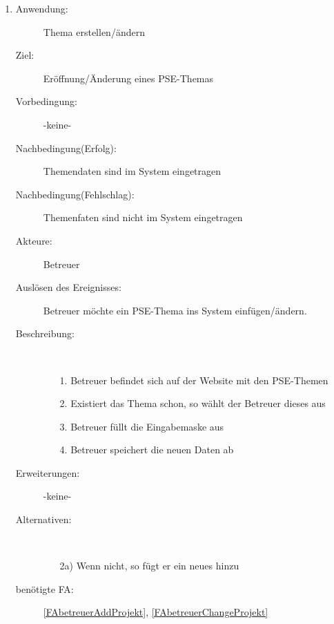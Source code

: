\documentclass[parskip=full]{scrartcl}
\newcommand{\swtLabel}[1]{\textbf{/#1\arabic*0/}}
\begin{document}
\begin{enumerate} [label=\swtLabel{B}]
  
  \item \label{UCbetreuerThemaErstellenÄndern}
	\begin{description}
  		\item[Anwendung:] Thema erstellen/ändern
  		\item[Ziel:] Eröffnung/Änderung eines \gls{PSE}-Themas
  		\item[Vorbedingung:] -keine-
  		\item[Nachbedingung(Erfolg):] Themendaten sind im System eingetragen
  		\item[Nachbedingung(Fehlschlag):] Themenfaten sind nicht im System
  		eingetragen
  		\item[Akteure:] Betreuer
  		\item[Auslösen des Ereignisses:] Betreuer möchte ein \gls{PSE}-Thema ins System
  		einfügen/ändern.
  		\item[Beschreibung:]~
  	\begin{enumerate}
  	  \item[1.] Betreuer befindet sich auf der Website mit den \gls{PSE}-Themen
  	  \item[2.] Existiert das Thema schon, so wählt der Betreuer dieses aus
  	  \item[3.] Betreuer füllt die Eingabemaske aus
  	  \item[4.] Betreuer speichert die neuen Daten ab
  	\end{enumerate}
  	\item[Erweiterungen:] -keine-
  	\item[Alternativen:]~
  	\begin{enumerate}
  	  \item[2a)] Wenn nicht, so fügt er ein neues hinzu
  	\end{enumerate}  
  	\item[benötigte FA:] \ref{FAbetreuerAddProjekt}, \ref{FAbetreuerChangeProjekt}
  \end{description}


\end{enumerate}
\end{document}
